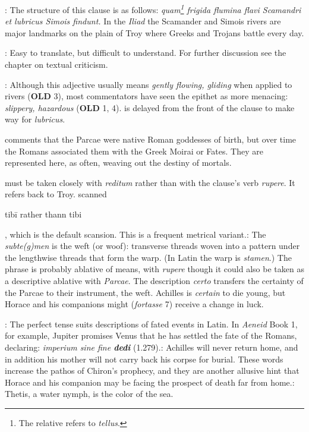 
: The structure of this clause is as follows: \textit{quam\footnote{The relative refers to \textit{tellus}.} frigida flumina flavi Scamandri et lubricus Simois findunt.}  In the \textit{Iliad} the Scamander and Simois rivers are major landmarks on the plain of Troy where Greeks and Trojans battle every day.


: Easy to translate, but difficult to understand.  For further discussion see the chapter on textual criticism.


: Although this adjective usually means \textit{gently flowing, gliding} when applied to rivers (\textbf{OLD} 3), most commentators have seen the epithet as more menacing: \textit{slippery, hazardous} (\textbf{OLD} 1, 4).\indent{} is delayed from the front of the clause to make way for \textit{lubricus}.


\citet[224--225]{mankin1995} comments that the Parcae were native Roman goddesses of birth, but over time the Romans associated them with the Greek Moirai or Fates.  They are represented here, as often, weaving out the destiny of mortals.


 must be taken closely with \textit{reditum} rather than with the clause's verb \textit{rupere}.  It refers back to Troy.\indent{} scanned \begin{metrica}t\-ib\=i rather thann t\-ib\-i\end{metrica}, which is the default scansion.  This is a frequent metrical variant.\indent{}: The \textit{subte(g)men} is the weft (or woof): transverse threads woven into a pattern under the lengthwise threads that form the warp.  (In Latin the warp is \textit{stamen}.)  The phrase is probably ablative of means, with \textit{rupere} though it could also be taken as a descriptive ablative with \textit{Parcae}.  The description \textit{certo} transfers the certainty of the Parcae to their instrument, the weft.  Achilles is \textit{certain} to die young, but Horace and his companions might (\textit{fortasse} 7) receive a change in luck.


: The perfect tense suits descriptions of fated events in Latin.  In \textit{Aeneid} Book 1, for example, Jupiter promises Venus that he has settled the fate of the Romans, declaring: \textit{imperium sine fine \textbf{dedi}} (1.279).\indent{}: Achilles will never return home, and in addition his mother will not carry back his corpse for burial.  These words increase the pathos of Chiron's prophecy, and they are another allusive hint that Horace and his companion may be facing the prospect of death far from home.\indent{}: Thetis, a water nymph, is the color of the sea.

